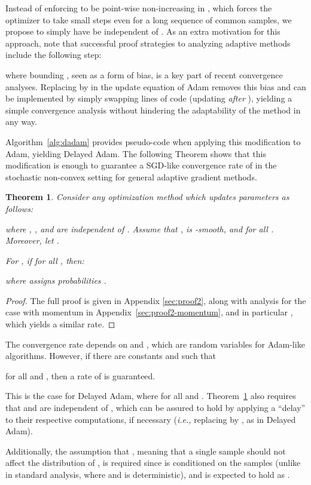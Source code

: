 \documentclass{article}
\newtheorem{thm}{Theorem}
\newcommand{\ie}{\textit{i.e.,} }
\newcommand{\thmref}[1]{Theorem~\ref{#1}}
\begin{document}
Instead of enforcing  to be point-wise non-increasing in 
\citep{amsgrad}, which forces the optimizer to take small steps even for a long
sequence of common samples, we propose to simply have  be independent
of .  As an extra motivation for this approach, note that successful
proof strategies \citep{yogi} to analyzing adaptive methods include the
following step:

where bounding , seen
as a form of bias, is a key part of recent convergence analyses.  Replacing
 by  in the update equation of Adam removes this bias and can
be implemented by simply swapping lines of code (updating  \textit{after}
), yielding a simple convergence analysis without hindering the adaptability of the method in any way.

Algorithm~\ref{alg:dadam} provides pseudo-code when applying this modification to Adam, yielding Delayed Adam.  The following Theorem shows that this
modification is enough to guarantee a SGD-like convergence rate of
 in the stochastic non-convex setting for general adaptive
gradient methods.

\begin{thm}
   \label{thm:dadamconv}
   Consider any optimization method which updates parameters as follows:
   
   where , , and
    are independent of . Assume that ,
    is -smooth, and
    for all
   .
   Moreover, let .

   For ,
   if  for all , then:
   
   where  assigns probabilities
      .
\end{thm}
\begin{proof}
   The full proof is given in Appendix \ref{sec:proof2}, along with analysis
   for the case with momentum  in
   Appendix~\ref{sec:proof2-momentum}, and in particular
   , which yields a similar rate.
\end{proof}

The convergence rate depends on  and , which are
random variables for Adam-like algorithms.  However, if there are constants
 and  such that

for all  and , then a
rate of  is guaranteed.

This is the case for Delayed Adam,
where  for all  and
.  \thmref{thm:dadamconv} also requires that  and  are
independent of , which can be assured to hold by applying a ``delay'' to
their respective computations, if necessary (\ie replacing  by
, as in Delayed Adam).

Additionally, the assumption that , meaning that a single
sample should not affect the distribution of
, is required since  is
conditioned on the samples  (unlike in standard analysis, where
 and  is deterministic), and is expected to
hold as .
\end{document}
